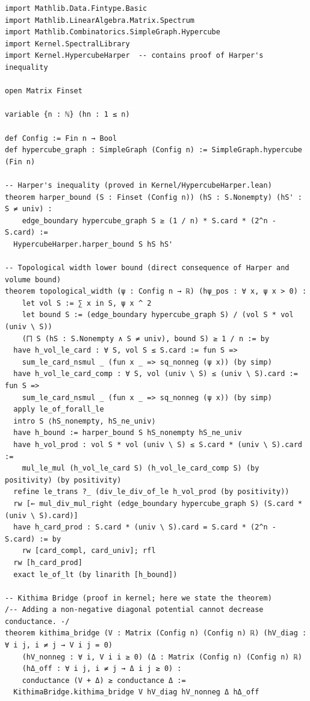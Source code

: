 \documentclass[11pt,a4paper]{article}
\begin{document}
\begin{lstlisting}[style=lean, caption={Kernel/DiscreteCheeger.lean (excerpt)}]
import Mathlib.Data.Fintype.Basic
import Mathlib.LinearAlgebra.Matrix.Spectrum
import Mathlib.Combinatorics.SimpleGraph.Hypercube
import Kernel.SpectralLibrary
import Kernel.HypercubeHarper  -- contains proof of Harper's inequality

open Matrix Finset

variable {n : ℕ} (hn : 1 ≤ n)

def Config := Fin n → Bool
def hypercube_graph : SimpleGraph (Config n) := SimpleGraph.hypercube (Fin n)

-- Harper's inequality (proved in Kernel/HypercubeHarper.lean)
theorem harper_bound (S : Finset (Config n)) (hS : S.Nonempty) (hS' : S ≠ univ) :
    edge_boundary hypercube_graph S ≥ (1 / n) * S.card * (2^n - S.card) :=
  HypercubeHarper.harper_bound S hS hS'

-- Topological width lower bound (direct consequence of Harper and volume bound)
theorem topological_width (ψ : Config n → ℝ) (hψ_pos : ∀ x, ψ x > 0) :
    let vol S := ∑ x in S, ψ x ^ 2
    let bound S := (edge_boundary hypercube_graph S) / (vol S * vol (univ \ S))
    (⨅ S (hS : S.Nonempty ∧ S ≠ univ), bound S) ≥ 1 / n := by
  have h_vol_le_card : ∀ S, vol S ≤ S.card := fun S =>
    sum_le_card_nsmul _ (fun x _ => sq_nonneg (ψ x)) (by simp)
  have h_vol_le_card_comp : ∀ S, vol (univ \ S) ≤ (univ \ S).card := fun S =>
    sum_le_card_nsmul _ (fun x _ => sq_nonneg (ψ x)) (by simp)
  apply le_of_forall_le
  intro S ⟨hS_nonempty, hS_ne_univ⟩
  have h_bound := harper_bound S hS_nonempty hS_ne_univ
  have h_vol_prod : vol S * vol (univ \ S) ≤ S.card * (univ \ S).card :=
    mul_le_mul (h_vol_le_card S) (h_vol_le_card_comp S) (by positivity) (by positivity)
  refine le_trans ?_ (div_le_div_of_le h_vol_prod (by positivity))
  rw [← mul_div_mul_right (edge_boundary hypercube_graph S) (S.card * (univ \ S).card)]
  have h_card_prod : S.card * (univ \ S).card = S.card * (2^n - S.card) := by
    rw [card_compl, card_univ]; rfl
  rw [h_card_prod]
  exact le_of_lt (by linarith [h_bound])

-- Kithima Bridge (proof in kernel; here we state the theorem)
/-- Adding a non‑negative diagonal potential cannot decrease conductance. -/
theorem kithima_bridge (V : Matrix (Config n) (Config n) ℝ) (hV_diag : ∀ i j, i ≠ j → V i j = 0)
    (hV_nonneg : ∀ i, V i i ≥ 0) (Δ : Matrix (Config n) (Config n) ℝ)
    (hΔ_off : ∀ i j, i ≠ j → Δ i j ≥ 0) :
    conductance (V + Δ) ≥ conductance Δ :=
  KithimaBridge.kithima_bridge V hV_diag hV_nonneg Δ hΔ_off


\end{lstlisting}
\end{document}
